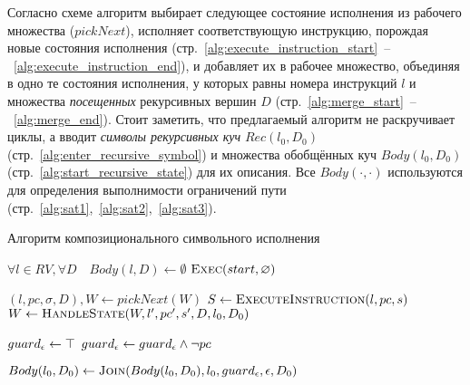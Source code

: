 Согласно схеме алгоритм выбирает следующее состояние исполнения из рабочего множества ($pickNext$), 
исполняет соответствующую инструкцию, порождая новые состояния исполнения 
(стр.~\ref{alg:execute_instruction_start}~--~\ref{alg:execute_instruction_end}), и добавляет их в рабочее множество, 
объединяя в одно те состояния исполнения, у которых равны номера инструкций $l$ и множества \emph{посещенных} рекурсивных вершин $D$
(стр.~\ref{alg:merge_start}~--~\ref{alg:merge_end}).
Стоит заметить, что предлагаемый алгоритм не раскручивает циклы, 
а вводит \emph{символы рекурсивных куч} $Rec(l_0, D_0)$ (стр.~\ref{alg:enter_recursive_symbol})
и множества обобщённых куч $Body(l_0,D_0)$ (стр.~\ref{alg:start_recursive_state}) для их описания.
Все $Body(\cdot,\cdot)$ используются для определения выполнимости ограничений пути 
(стр.~\ref{alg:sat1},~\ref{alg:sat2},~\ref{alg:sat3}).

\begin{algorithm}
    \caption{Алгоритм композиционального символьного исполнения}\label{compositional_algo}
\begin{algorithmic}[1]
    \State $\forall l \in RV, \forall D \quad Body(l,D) \gets \emptyset$
    \State \Return $\text{$\textsc{Exec}(start,\emptyset)$}$ \label{alg:start_vertex}
    
         \label{alg:while_start}
            \State $(l,pc,\sigma,D), W \gets pickNext(W)$
            \State $S \gets \textsc{ExecuteInstruction}(l,pc,s)$
                \State $W \gets \textsc{HandleState}(W, l',pc',s', D, l_0, D_0)$
            \EndFor
        \EndWhile \label{alg:while_end}
    
            \State $guard_{\emptyheap} \gets \top$ \label{alg:epsilon_equation_start}
               \State $guard_{\emptyheap} \gets guard_{\emptyheap} \land \lnot pc$
            \EndFor

            \State $Body(l_0,D_0) \gets \textsc{Join}(Body(l_0,D_0), l_0, guard_{\emptyheap}, \emptyheap, D_0)$ \label{alg:epsilon_equation_end}
        \Else
                \label{alg:print_errors}\;  
        \EndIf
    \EndProcedure
\end{algorithmic}
\end{algorithm}

